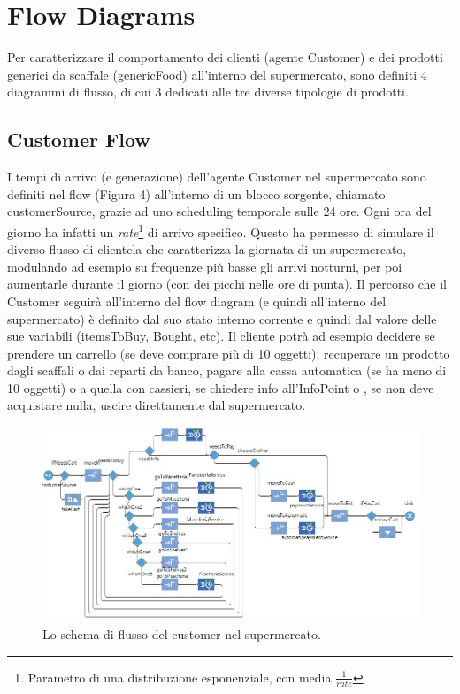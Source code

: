 \documentclass{article}
\begin{document}
\section{Flow Diagrams}
Per caratterizzare il comportamento dei clienti (agente Customer) e dei prodotti generici da scaffale (genericFood) all'interno del supermercato, sono definiti 4 diagrammi di flusso, di cui 3 dedicati alle tre diverse tipologie di prodotti.
\subsection{Customer Flow}
I tempi di arrivo (e generazione) dell'agente Customer nel supermercato sono definiti nel flow (Figura 4) all'interno di un blocco sorgente, chiamato \textsf{customerSource}, grazie ad uno scheduling temporale sulle 24 ore. Ogni ora del giorno ha infatti un \textit{rate}\footnote{Parametro di una distribuzione esponenziale, con media $\frac{1}{rate} $ } di arrivo specifico. Questo ha permesso di simulare il diverso flusso di clientela che caratterizza la giornata di un supermercato, modulando ad esempio su frequenze più basse gli arrivi notturni, per poi aumentarle durante il giorno (con dei picchi nelle ore di punta).
\newline
\newline
Il percorso che il Customer seguirà all'interno del flow diagram (e quindi all'interno del supermercato) è definito dal suo stato interno corrente e quindi dal valore delle sue variabili (itemsToBuy, Bought, etc). Il cliente potrà ad esempio decidere se prendere un carrello (se deve comprare più di 10 oggetti), recuperare un prodotto dagli scaffali o dai reparti da banco, pagare alla cassa automatica (se ha meno di 10 oggetti) o a quella con cassieri, se chiedere info all'InfoPoint o , se non deve acquistare nulla, uscire direttamente dal supermercato.

\begin{center}
\begin{figure}[h]
\center
\label{custflow}
\includegraphics[scale=0.5]{./cust_flow.jpg}
\caption{\footnotesize{Lo schema di flusso del customer nel supermercato.}}
\end{figure}
\end{center}
\end{document}
